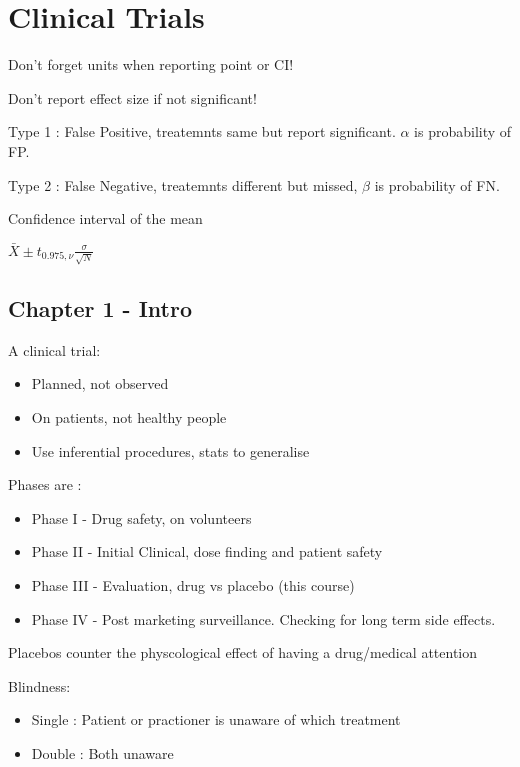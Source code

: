 \documentclass[
  letterpaper,
  DIV=11,
  numbers=noendperiod]{scrreprt}
\providecommand{\tightlist}{%
  \setlength{\itemsep}{0pt}\setlength{\parskip}{0pt}}\usepackage{longtable,booktabs,array}
\begin{document}

\hypertarget{clinical-trials}{%
\chapter{Clinical Trials}\label{clinical-trials}}

Don't forget units when reporting point or CI!

Don't report effect size if not significant!

Type 1 : False Positive, treatemnts same but report significant.
\(\alpha\) is probability of FP.

Type 2 : False Negative, treatemnts different but missed, \(\beta\) is
probability of FN.

Confidence interval of the mean

\(\bar{X} \pm t_{0.975, \nu} \frac{\sigma}{\sqrt{N}}\)

\hypertarget{chapter-1---intro}{%
\section{Chapter 1 - Intro}\label{chapter-1---intro}}

A clinical trial:

\begin{itemize}
\tightlist
\item
  Planned, not observed
\item
  On patients, not healthy people
\item
  Use inferential procedures, stats to generalise
\end{itemize}

Phases are :

\begin{itemize}
\tightlist
\item
  Phase I - Drug safety, on volunteers
\item
  Phase II - Initial Clinical, dose finding and patient safety
\item
  Phase III - Evaluation, drug vs placebo (this course)
\item
  Phase IV - Post marketing surveillance. Checking for long term side
  effects.
\end{itemize}

Placebos counter the physcological effect of having a drug/medical
attention

Blindness:

\begin{itemize}
\tightlist
\item
  Single : Patient or practioner is unaware of which treatment
\item
  Double : Both unaware
\end{itemize}
\end{document}
